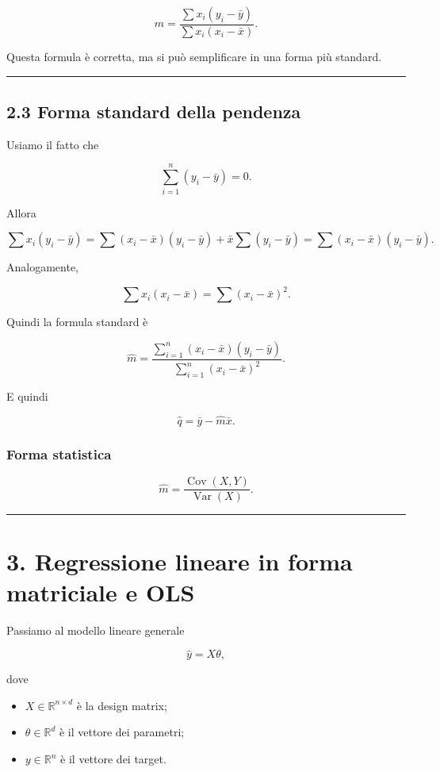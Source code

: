 \documentclass[
]{article}
\providecommand{\tightlist}{%
  \setlength{\itemsep}{0pt}\setlength{\parskip}{0pt}}
\begin{document}
\[
m=\frac{\sum x_i(y_i-\bar y)}{\sum x_i(x_i-\bar x)}.
\]

Questa formula è corretta, ma si può semplificare in una forma più
standard.

\begin{center}\rule{0.5\linewidth}{0.5pt}\end{center}

\subsection{2.3 Forma standard della
pendenza}\label{forma-standard-della-pendenza}

Usiamo il fatto che

\[
\sum_{i=1}^n (y_i-\bar y)=0.
\]

Allora

\[
\sum x_i(y_i-\bar y)
=
\sum (x_i-\bar x)(y_i-\bar y)
+
\bar x \sum (y_i-\bar y)
=
\sum (x_i-\bar x)(y_i-\bar y).
\]

Analogamente,

\[
\sum x_i(x_i-\bar x)
=
\sum (x_i-\bar x)^2.
\]

Quindi la formula standard è

\[
\hat m
=
\frac{\sum_{i=1}^n (x_i-\bar x)(y_i-\bar y)}
{\sum_{i=1}^n (x_i-\bar x)^2}.
\]

E quindi

\[
\hat q = \bar y - \hat m \bar x.
\]

\subsubsection{Forma statistica}\label{forma-statistica}

\[
\hat m = \frac{\operatorname{Cov}(X,Y)}{\operatorname{Var}(X)}.
\]

\begin{center}\rule{0.5\linewidth}{0.5pt}\end{center}

\section{3. Regressione lineare in forma matriciale e
OLS}\label{regressione-lineare-in-forma-matriciale-e-ols}

Passiamo al modello lineare generale

\[
\hat y = X\theta,
\]

dove

\begin{itemize}
\tightlist
\item
  \(X \in \mathbb{R}^{n\times d}\) è la design matrix;
\item
  \(\theta\in\mathbb{R}^d\) è il vettore dei parametri;
\item
  \(y\in\mathbb{R}^n\) è il vettore dei target.
\end{itemize}
\end{document}
